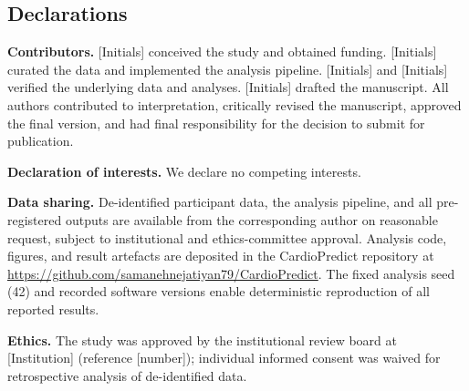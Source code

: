 \documentclass[english,11pt]{article}
\begin{document}
\subsection*{Declarations}

\noindent\textbf{Contributors.} [Initials] conceived the study and obtained funding. [Initials] curated the data and implemented the analysis pipeline. [Initials] and [Initials] verified the underlying data and analyses. [Initials] drafted the manuscript. All authors contributed to interpretation, critically revised the manuscript, approved the final version, and had final responsibility for the decision to submit for publication.

\noindent\textbf{Declaration of interests.} We declare no competing interests.

\noindent\textbf{Data sharing.} De-identified participant data, the analysis pipeline, and all pre-registered outputs are available from the corresponding author on reasonable request, subject to institutional and ethics-committee approval. Analysis code, figures, and result artefacts are deposited in the CardioPredict repository at \url{https://github.com/samanehnejatiyan79/CardioPredict}. The fixed analysis seed (42) and recorded software versions enable deterministic reproduction of all reported results.

\noindent\textbf{Ethics.} The study was approved by the institutional review board at [Institution] (reference [number]); individual informed consent was waived for retrospective analysis of de-identified data.
\end{document}
